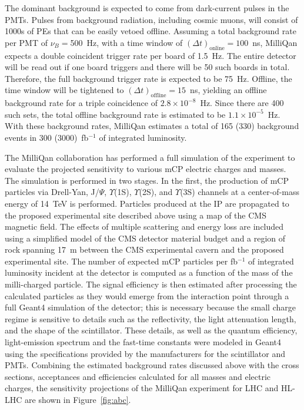 The dominant background is expected to come from dark-current pulses in the PMTs. Pulses from background radiation, including cosmic muons, will consist of 1000s of PEs that can be easily vetoed offline. Assuming a total background rate per PMT of $\nu_B = $500~Hz, with a time window of $(\Delta t)_{\mathrm{online}} =100$~ns, MilliQan expects a double coincident trigger rate per board of 1.5~Hz. The entire detector will be read out if one board triggers and there will be 50 such boards in total. Therefore, the full background trigger rate is expected to be 75~Hz. Offline, the time window will be tightened to $(\Delta t)_{\mathrm{offline}} =15$~ns, yielding an offline background rate for a triple coincidence of $2.8\times10^{-8}$~Hz. Since there are 400 such sets, the total offline background rate is estimated to be $1.1\times10^{-5}$~Hz. With these background rates, MilliQan estimates a total of 165 (330) background events in 300 (3000)~fb$^{-1}$ of integrated luminosity. %

The MilliQan collaboration has performed a full simulation of the experiment to evaluate the projected sensitivity to various mCP electric charges and masses. The simulation is performed in two stages. In the first, the production of mCP particles via Drell-Yan, J/$\Psi$, $\Upsilon$(1S), $\Upsilon$(2S), and $\Upsilon$(3S) channels at a center-of-mass energy of 14~TeV is performed. Particles produced at the IP are propagated to the proposed experimental site described above using a map of the CMS magnetic field. The effects of multiple scattering and energy loss are included using a simplified model of the CMS detector material budget and a region of rock spanning 17~m between the CMS experimental cavern and the proposed experimental site. The number of expected mCP particles per fb$^{-1}$ of integrated luminosity incident at the detector is computed as a function of the mass of the milli-charged particle. The signal efficiency is then estimated after processing the calculated particles as they would emerge from the interaction point through a full {\sc Geant4} simulation of the detector; this is necessary because the small charge regime is sensitive to details such as the reflectivity, the light attenuation length, and the shape of the scintillator. These details, as well as the quantum efficiency, light-emission spectrum and the fast-time constants were modeled in {\sc Geant4} using the specifications provided by the manufacturers for the scintillator and PMTs. Combining the estimated background rates discussed above with the cross sections, acceptances and efficiencies calculated for all masses and electric charges, the sensitivity projections of the MilliQan experiment for LHC and HL-LHC are shown in Figure~\ref{fig:abc}.

